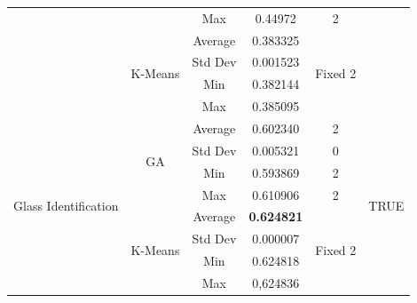 \documentclass[journal]{IEEEtran}
\begin{document}
\begin{table}[]
\begin{tabular}{|c|c|c|c|c|c|}
		&                               & Max                            & 0.44972                     & 2                        &                       \\ \cline{2-5}
		& \multirow{4}{*}{K-Means}      & Average                        & 0.383325                    & \multirow{4}{*}{Fixed 2} &                       \\ \cline{3-4}
		&                               & Std Dev                        & 0.001523                    &                          &                       \\ \cline{3-4}
		&                               & Min                            & 0.382144                    &                          &                       \\ \cline{3-4}
		&                               & Max                            & 0.385095                    &                          &                       \\ \hline
		\multirow{8}{*}{Glass Identification}  & \multirow{4}{*}{GA}           & Average                        & 0.602340                    & 2                        & \multirow{8}{*}{TRUE} \\ \cline{3-5}
		&                               & Std Dev                        & 0.005321                    & 0                        &                       \\ \cline{3-5}
		&                               & Min                            & 0.593869                    & 2                        &                       \\ \cline{3-5}
		&                               & Max                            & 0.610906                    & 2                        &                       \\ \cline{2-5}
		& \multirow{4}{*}{K-Means}      & Average                        & \textbf{0.624821}                    & \multirow{4}{*}{Fixed 2} &                       \\ \cline{3-4}
		&                               & Std Dev                        & 0.000007                    &                          &                       \\ \cline{3-4}
		&                               & Min                            & 0.624818                    &                          &                       \\ \cline{3-4}
		&                               & Max                            & 0,624836                    &                          &                       \\ \hline

\end{tabular}
\end{table}
\end{document}
